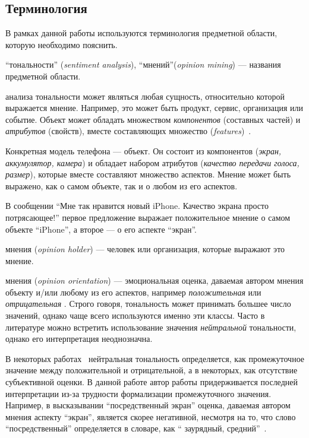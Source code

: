 \subsection{Терминология}

 В рамках данной работы используются терминология предметной области, 
 которую необходимо пояснить.

``{ тональности}'' (\textit{sentiment analysis}), 
``{ мнений}''(\textit{opinion mining}) --- названия предметной области.

{} анализа тональности может являться любая сущность, 
относительно которой выражается мнение. Например, это может быть продукт,
сервис, организация или событие. Объект может обладать множеством 
\textit{компонентов}  (составных частей) и \textit{атрибутов} (свойств), 
вместе составляющих множество {} 
(\textit{features})~\cite{multi_faceted}.

Конкретная модель телефона --- объект. Он состоит из компонентов 
(\textit{экран, аккумулятор, камера}) и обладает набором атрибутов 
(\textit{качество передачи голоса, размер}), 
которые вместе составляют множество аспектов. 
Мнение может быть выражено, как о самом объекте, так и о любом из его аспектов.

В сообщении ``Мне так нравится новый iPhone. Качество экрана просто потрясающее!'' 
первое предложение выражает положительное мнение о самом объекте ``iPhone'', 
а второе --- о его аспекте ``экран''.

{ мнения} (\textit{opinion holder}) --- человек или организация, которые 
выражают это мнение. 

{ мнения} (\textit{opinion orientation}) --- эмоциональная оценка, 
даваемая автором мнения объекту и/или любому из его аспектов, например \textit{
положительная} или \textit{отрицательная} . Строго говоря, тональность может 
принимать большее число значений, однако чаще всего используются именно эти 
классы. Часто в литературе можно встретить использование значения \textit{
нейтральной} тональности, однако его интерпретация неоднозначна. 

В некоторых работах~\cite{panglee} нейтральная тональность определяется, как 
промежуточное значение между положительной и отрицательной, а в некоторых, 
как отсутствие субъективной оценки. В данной работе автор работы 
придерживается последней интерпретации из-за трудности формализации 
промежуточного значения. Например, в высказывании ``посредственный экран'' 
оценка, даваемая автором мнения аспекту ``экран'', является скорее негативной, 
несмотря на то, что слово ``посредственный'' определяется в словаре, как ``
заурядный, средний''~\cite{wiki_middling}.

